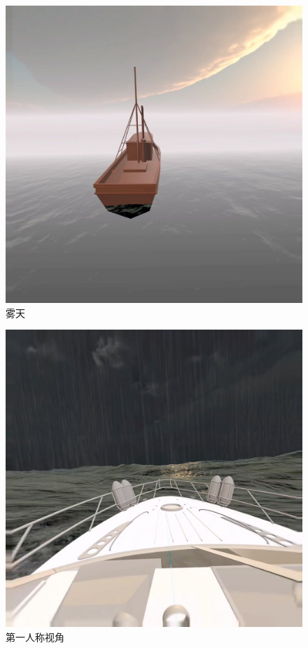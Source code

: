 \documentclass[a4paper,10pt]{article}
\begin{document}
		\begin{figure}[htbp]
			\centering				
			\includegraphics[width=0.9\columnwidth]{picture/Third-person perspective-IP}
			\caption{
				\label{fig: Third-person perspective-IP} 
				雾天
			}	
		\end{figure}
		
		\begin{figure}[htbp]
			\centering				
			\includegraphics[width=0.9\columnwidth]{picture/First-person perspective storm-IP}
			\caption{
				\label{fig: First-person perspective storm-IP} 
				第一人称视角
			}	
		\end{figure}
		
\end{document}
